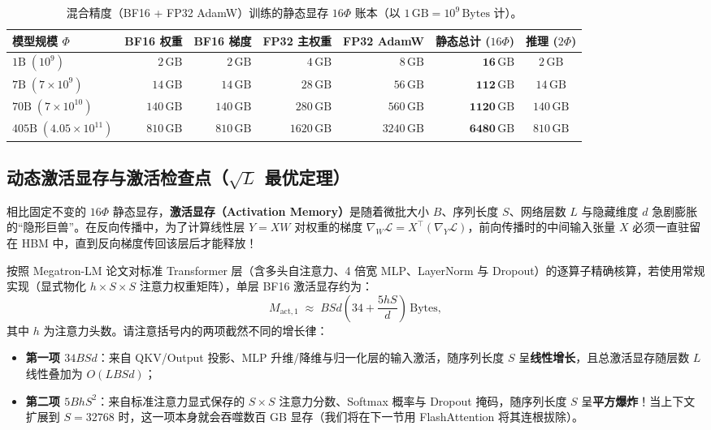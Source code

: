 \begin{table}[htbp]
\centering
\caption{混合精度（BF16 + FP32 AdamW）训练的静态显存 $16\Phi$ 账本（以 $1\,\mathrm{GB} = 10^9\,\mathrm{Bytes}$ 计）。}
\label{tab:16phi-ledger}
\footnotesize
\setlength{\tabcolsep}{4.0pt}
\begin{tabular}{@{}lrrrrrc@{}}
\toprule
\textbf{模型规模 $\Phi$} & \textbf{BF16 权重} & \textbf{BF16 梯度} & \textbf{FP32 主权重} & \textbf{FP32 AdamW} & \textbf{静态总计 ($16\Phi$)} & \textbf{推理 ($2\Phi$)} \\
\midrule
$1\mathrm{B}\;(10^9)$ & $2\,\mathrm{GB}$ & $2\,\mathrm{GB}$ & $4\,\mathrm{GB}$ & $8\,\mathrm{GB}$ & $\mathbf{16\,\mathrm{GB}}$ & $2\,\mathrm{GB}$ \\
$7\mathrm{B}\;(7\times 10^9)$ & $14\,\mathrm{GB}$ & $14\,\mathrm{GB}$ & $28\,\mathrm{GB}$ & $56\,\mathrm{GB}$ & $\mathbf{112\,\mathrm{GB}}$ & $14\,\mathrm{GB}$ \\
$70\mathrm{B}\;(7\times 10^{10})$ & $140\,\mathrm{GB}$ & $140\,\mathrm{GB}$ & $280\,\mathrm{GB}$ & $560\,\mathrm{GB}$ & $\mathbf{1120\,\mathrm{GB}}$ & $140\,\mathrm{GB}$ \\
$405\mathrm{B}\;(4.05\times 10^{11})$ & $810\,\mathrm{GB}$ & $810\,\mathrm{GB}$ & $1620\,\mathrm{GB}$ & $3240\,\mathrm{GB}$ & $\mathbf{6480\,\mathrm{GB}}$ & $810\,\mathrm{GB}$ \\
\bottomrule
\end{tabular}
\end{table}

\subsection{动态激活显存与激活检查点（$\sqrt{L}$ 最优定理）}

相比固定不变的 $16\Phi$ 静态显存，\textbf{激活显存（Activation Memory）}是随着微批大小 $B$、序列长度 $S$、网络层数 $L$ 与隐藏维度 $d$ 急剧膨胀的“隐形巨兽”。在反向传播中，为了计算线性层 $Y = XW$ 对权重的梯度 $\nabla_W \mathcal{L} = X^\top (\nabla_Y \mathcal{L})$，前向传播时的中间输入张量 $X$ 必须一直驻留在 HBM 中，直到反向梯度传回该层后才能释放！

按照 Megatron-LM 论文对标准 Transformer 层（含多头自注意力、4 倍宽 MLP、LayerNorm 与 Dropout）的逐算子精确核算，若使用常规实现（显式物化 $h \times S \times S$ 注意力权重矩阵），单层 BF16 激活显存约为：
\begin{equation}
  M_{\mathrm{act,1}} \;\approx\; B S d \left(34 + \frac{5 h S}{d}\right)\,\text{Bytes},
  \label{eq:act-memory-layer}
\end{equation}
其中 $h$ 为注意力头数。请注意括号内的两项截然不同的增长律：
\begin{itemize}
  \item \textbf{第一项 $34 B S d$}：来自 QKV/Output 投影、MLP 升维/降维与归一化层的输入激活，随序列长度 $S$ 呈\textbf{线性增长}，且总激活显存随层数 $L$ 线性叠加为 $O(L B S d)$；
  \item \textbf{第二项 $5 B h S^2$}：来自标准注意力显式保存的 $S\times S$ 注意力分数、Softmax 概率与 Dropout 掩码，随序列长度 $S$ 呈\textbf{平方爆炸}！当上下文扩展到 $S = 32768$ 时，这一项本身就会吞噬数百 GB 显存（我们将在下一节用 FlashAttention 将其连根拔除）。
\end{itemize}

